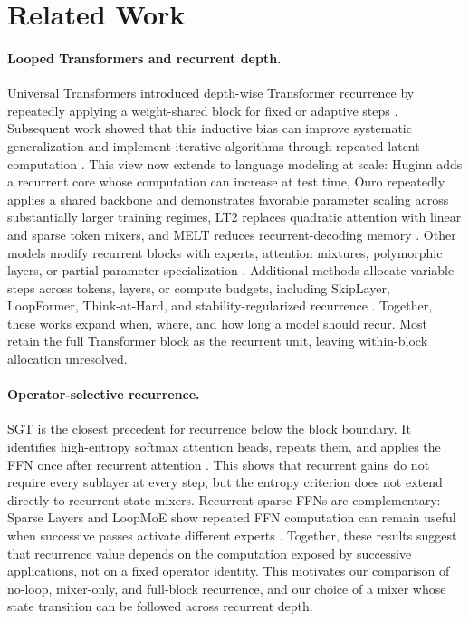 \documentclass{article}
\begin{document}
\section{Related Work}

\paragraph{Looped Transformers and recurrent depth.}
Universal Transformers introduced depth-wise Transformer recurrence by
repeatedly applying a weight-shared block for fixed or adaptive steps
\cite{dehghani2019universaltransformers}. Subsequent work showed that this
inductive bias can improve systematic generalization and implement iterative
algorithms through repeated latent computation
\cite{yang2024loopedtransformersbetterlearning,saunshi2025reasoninglatentthoughtspower}.
This view now extends to language modeling at scale: Huginn adds a recurrent
core whose computation can increase at test time, Ouro repeatedly applies a
shared backbone and demonstrates favorable parameter scaling across
substantially larger training regimes, LT2 replaces quadratic attention with
linear and sparse token mixers, and MELT reduces recurrent-decoding memory
\cite{geiping2025scalingtesttimecomputelatent,zhu2025ouro,deng2026lt2lineartimeloopedtransformers,vendrell2026memoryefficient}.
Other models modify recurrent blocks with experts, attention mixtures,
polymorphic layers, or partial parameter specialization
\cite{csordas2024moeut,knupp2026depthrecurrentattentionmixturesgiving,chen2026polymorphicuniversal,zeitoun2026hyperlooptransformers}.
Additional methods allocate variable steps across tokens, layers, or compute
budgets, including SkipLayer, LoopFormer, Think-at-Hard, and
stability-regularized recurrence
\cite{li2025skiplayerloopit,jeddi2026loopformer,fu2026thinkhard,yang2026stabilizing,fan2025loopedtransformerslengthgeneralization}.
Together, these works expand when, where, and how long a model should recur.
Most retain the full Transformer block as the recurrent unit, leaving
within-block allocation unresolved.

\paragraph{Operator-selective recurrence.}
SGT is the closest precedent for recurrence below the block boundary. It
identifies high-entropy softmax attention heads, repeats them, and applies the
FFN once after recurrent attention \cite{chen2026sparsegrowingtransformertrainingtime}.
This shows that recurrent gains do not require every sublayer at every step,
but the entropy criterion does not extend directly to recurrent-state mixers.
Recurrent sparse FFNs are complementary: Sparse Layers and LoopMoE show
repeated FFN computation can remain useful when successive passes activate
different experts \cite{lee2026sparselayerscriticalscaling,chen2026loopmoeunifyingiterativecomputation}.
Together, these results suggest that recurrence value depends on the computation
exposed by successive applications, not on a fixed operator identity. This
motivates our comparison of no-loop, mixer-only, and full-block recurrence, and
our choice of a mixer whose state transition can be followed across recurrent
depth.
\end{document}
